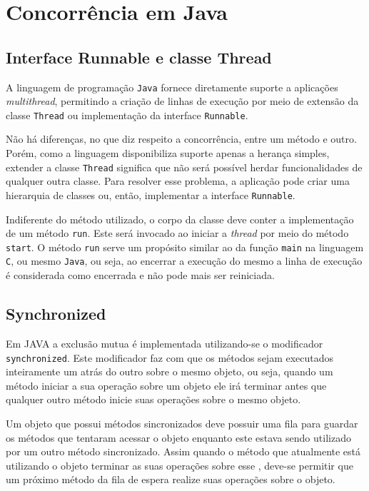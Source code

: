 \chapter{Concorrência em Java}
\label{cha:concjava}

\section{Interface Runnable e classe Thread}

A linguagem de programação \texttt{Java} fornece diretamente suporte a
aplicações \textit{multithread}, permitindo a criação de linhas de
execução por meio de extensão da classe \verb!Thread! ou implementação
da interface \verb!Runnable!.

Não há diferenças, no que diz respeito a concorrência, entre um método
e outro. Porém, como a linguagem disponibiliza suporte apenas a
herança simples, extender a classe \verb!Thread! significa que não
será possível herdar funcionalidades de qualquer outra classe. Para
resolver esse problema, a aplicação pode criar uma hierarquia de
classes ou, então, implementar a interface \verb!Runnable!.

Indiferente do método utilizado, o corpo da classe deve conter a
implementação de um método \verb!run!. Este será invocado ao iniciar a
\textit{thread} por meio do método \verb!start!. O método \verb!run!
serve um propósito similar ao da função \verb!main! na linguagem
\texttt{C}, ou mesmo \texttt{Java}, ou seja, ao encerrar a execução do
mesmo a linha de execução é considerada como encerrada e não pode mais
ser reiniciada.

\section{Synchronized}

Em JAVA a exclusão mutua é implementada utilizando-se o modificador
\texttt{synchronized}. Este modificador faz com que os métodos sejam
executados inteiramente um atrás do outro sobre o mesmo objeto, ou seja,
quando um método iniciar a sua operação sobre um objeto ele irá terminar
antes que qualquer outro método inicie suas operações sobre o mesmo objeto.

Um objeto que possui métodos sincronizados deve possuir uma fila para
guardar os métodos que tentaram acessar o objeto enquanto este estava sendo
utilizado por um outro método sincronizado. Assim quando o método que
atualmente está utilizando o objeto terminar as suas operações sobre esse
, deve-se permitir que um próximo método da fila de espera realize suas
operações sobre o objeto. 

